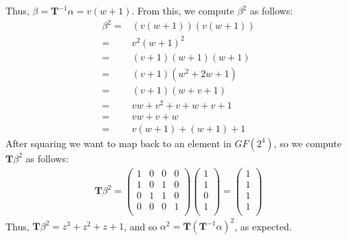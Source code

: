 Thus, $\beta = \mathbf{T}^{-1}\alpha = v(w + 1)$. From this, we compute $\beta^2$ as follows:
\begin{align*}
\beta^2 = & (v(w + 1))(v(w + 1)) \\
= & v^2(w+1)^2 \\
= & (v + 1)(w + 1)(w + 1) \\
= & (v + 1)(w^2 + 2w + 1) \\
= & (v + 1)(w + v + 1) \\
= & vw + v^2 + v + w + v + 1 \\
= & vw + v + w \\
= & v(w + 1) + (w + 1) + 1
\end{align*}
After squaring we want to map back to an element in $GF(2^4)$, so we compute $\mathbf{T}\beta^2$ as follows:
\begin{align*}
\mathbf{T}\beta^2 = 
\begin{pmatrix}
1 & 0 & 0 & 0 \\
1 & 0 & 1 & 0 \\
0 & 1 & 1 & 0 \\
0 & 0 & 0 & 1 \\
\end{pmatrix}
\begin{pmatrix}
1\\
1\\
0\\
1\\
\end{pmatrix} = 
\begin{pmatrix}
1\\
1\\
1\\
1\\
\end{pmatrix}
\end{align*}
Thus, $\mathbf{T}\beta^2 = z^3 + z^2 + z + 1$, and so $\alpha^2 = \mathbf{T}(\mathbf{T}^{-1}\alpha)^2$, as expected.

